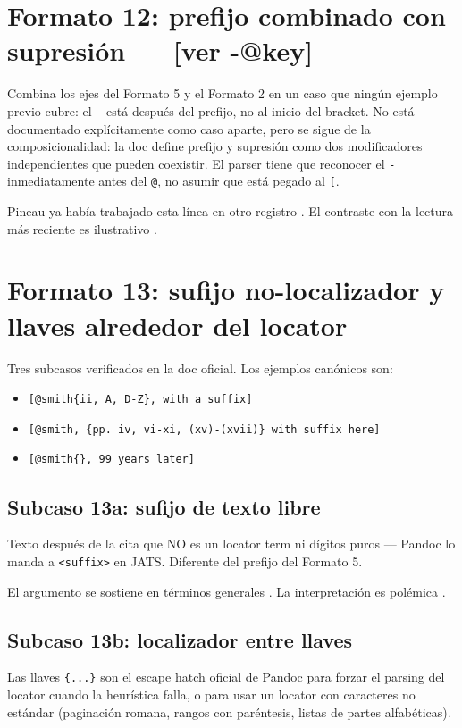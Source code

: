 \section{Formato 12: prefijo combinado con supresión — [ver -@key]}
Combina los ejes del Formato 5 y el Formato 2 en un caso que ningún ejemplo previo cubre: el \texttt{-} está después del prefijo, no al inicio del bracket. No está documentado explícitamente como caso aparte, pero se sigue de la composicionalidad: la doc define prefijo y supresión como dos modificadores independientes que pueden coexistir. El parser tiene que reconocer el \texttt{-} inmediatamente antes del \texttt{@}, no asumir que está pegado al \texttt{[}.

Pineau ya había trabajado esta línea en otro registro \autocite*[ver][]{3041-PINEAU1999}. El contraste con la lectura más reciente es ilustrativo \autocite*[cf.][]{3036-ORBUCH2020}.


\section{Formato 13: sufijo no-localizador y llaves alrededor del locator}
Tres subcasos verificados en la doc oficial. Los ejemplos canónicos son:

\begin{itemize}
  \item \texttt{[@smith\{ii, A, D-Z\}, with a suffix]}
  \item \texttt{[@smith, \{pp. iv, vi-xi, (xv)-(xvii)\} with suffix here]}
  \item \texttt{[@smith\{\}, 99 years later]}
\end{itemize}

\subsection{Subcaso 13a: sufijo de texto libre}
Texto después de la cita que NO es un locator term ni dígitos puros — Pandoc lo manda a \texttt{<suffix>} en JATS. Diferente del prefijo del Formato 5.

El argumento se sostiene en términos generales \autocite[énfasis añadido]{2961-KACZAN2016}. La interpretación es polémica \autocite[pero ver la crítica reciente]{3041-PINEAU1999}.


\subsection{Subcaso 13b: localizador entre llaves}
Las llaves \texttt{\{...\}} son el escape hatch oficial de Pandoc para forzar el parsing del locator cuando la heurística falla, o para usar un locator con caracteres no estándar (paginación romana, rangos con paréntesis, listas de partes alfabéticas).

